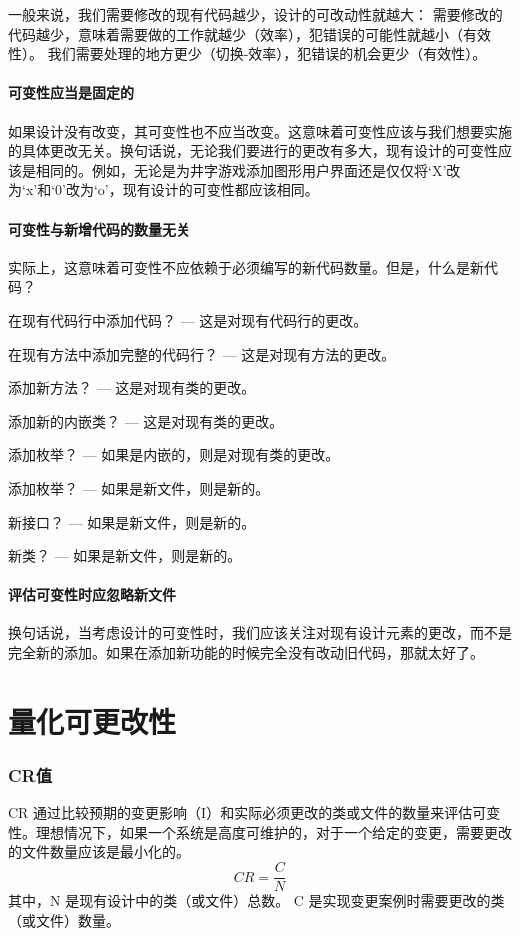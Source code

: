 
一般来说，我们需要修改的现有代码越少，设计的可改动性就越大：
需要修改的代码越少，意味着需要做的工作就越少（效率），犯错误的可能性就越小（有效性）。
我们需要处理的地方更少（切换-效率），犯错误的机会更少（有效性）。

\paragraph{可变性应当是固定的}如果设计没有改变，其可变性也不应当改变。这意味着可变性应该与我们想要实施的具体更改无关。换句话说，无论我们要进行的更改有多大，现有设计的可变性应该是相同的。例如，无论是为井字游戏添加图形用户界面还是仅仅将`X'改为`x'和`0'改为`o'，现有设计的可变性都应该相同。

\paragraph{可变性与新增代码的数量无关}实际上，这意味着可变性不应依赖于必须编写的新代码数量。但是，什么是新代码？

在现有代码行中添加代码？ — 这是对现有代码行的更改。

在现有方法中添加完整的代码行？ — 这是对现有方法的更改。

添加新方法？ — 这是对现有类的更改。

添加新的内嵌类？ — 这是对现有类的更改。

添加枚举？ — 如果是内嵌的，则是对现有类的更改。

添加枚举？ — 如果是新文件，则是新的。

新接口？ — 如果是新文件，则是新的。

新类？ — 如果是新文件，则是新的。

\paragraph{评估可变性时应忽略新文件}换句话说，当考虑设计的可变性时，我们应该关注对现有设计元素的更改，而不是完全新的添加。如果在添加新功能的时候完全没有改动旧代码，那就太好了。

\section*{量化可更改性}
\subsubsection{CR值}
CR 通过比较预期的变更影响（I）和实际必须更改的类或文件的数量来评估可变性。理想情况下，如果一个系统是高度可维护的，对于一个给定的变更，需要更改的文件数量应该是最小化的。
\[\displaystyle CR = \frac{C}{N}\]
其中，N 是现有设计中的类（或文件）总数。
C 是实现变更案例时需要更改的类（或文件）数量。

